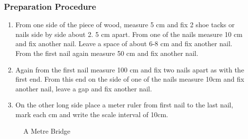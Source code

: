 \subsubsection*{Preparation Procedure}
\begin{enumerate}
\item{From one side of the piece of wood, measure 5 cm and fix 2 shoe tacks or nails side by side about 2.  5 cm apart. From one of the nails measure 10 cm and fix another nail. Leave a space of about 6-8 cm and fix another nail. From the first nail again measure 50 cm and fix another nail.} 
\item{Again from the first nail measure 100 cm and fix two nails apart as with the first end. From this end on the side of one of the nails measure 10cm and fix another nail, leave a gap and fix another nail.} 
\item{On the other long side place a meter ruler from first nail to the last nail, mark each cm and write the scale interval of 10cm.} 
\end{enumerate}

\begin{figure}
\begin{center}
\def\svgwidth{350pt}

\caption{A Metre Bridge}
\label{fig:metre-bridge}
\end{center}
\end{figure}

